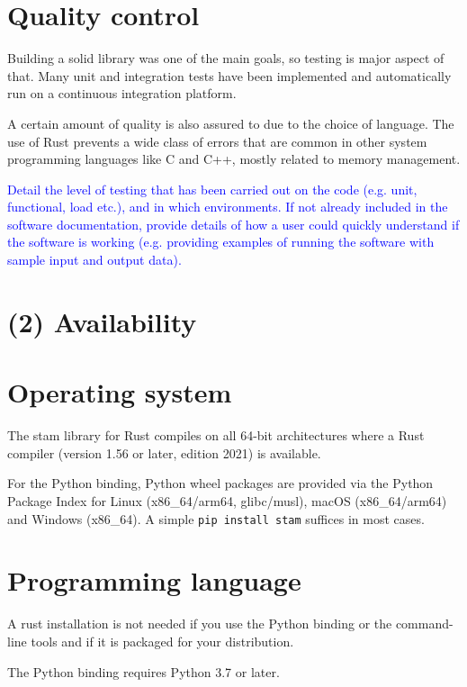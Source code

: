 \documentclass{jors}
\begin{document}
\section*{Quality control}

Building a solid library was one of the main goals, so testing is major 
aspect of that. Many unit and integration tests have been implemented and
automatically run on a continuous integration platform.

A certain amount of quality is also assured to due to the choice of
language. The use of Rust prevents a wide class of errors that are common in
other system programming languages like C and C++, mostly related to memory
management.






\textcolor{blue}{Detail the level of testing that has been carried out on the
code (e.g. unit, functional, load etc.), and in which environments. If not
already included in the software documentation, provide details of how a user
could quickly understand if the software is working (e.g. providing examples of
running the software with sample input and output data). }

\section*{(2) Availability}
\vspace{0.5cm}
\section*{Operating system}

The stam library for Rust compiles on all 64-bit architectures where a Rust compiler (version 1.56 or later, edition 2021) is available.

For the Python binding, Python wheel packages are provided via the Python Package Index for Linux (x86_64/arm64, glibc/musl), macOS (x86_64/arm64) and Windows (x86_64).
A simple \texttt{pip install stam} suffices in most cases.

\section*{Programming language}

A rust installation is not needed if you use the Python binding or the command-line tools and if it is packaged for your distribution.

The Python binding requires Python 3.7 or later. 
\end{document}
